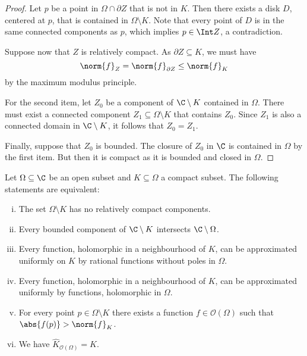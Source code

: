 \begin{proof}
Let $p$ be a point in $\Omega \cap \partial Z$ that is not in $K$.
Then there exists a disk $D$, centered at $p$, that is contained in
$\Omega \setminus K$. Note that every point of $D$ is in the same
connected components as $p$, which implies $p \in \Int Z$, a
contradiction.

Suppose now that $Z$ is relatively compact. As
$\partial Z \subseteq K$, we must have
\[
\norm{f}_Z = \norm{f}_{\partial Z} \leq \norm{f}_K
\]
by the maximum modulus principle.

For the second item, let $Z_0$ be a component of $\C \setminus K$
contained in $\Omega$. There must exist a connected component
$Z_1 \subseteq \Omega \setminus K$ that contains $Z_0$. Since
$Z_1$ is also a connected domain in $\C \setminus K$, it follows
that $Z_0 = Z_1$.

Finally, suppose that $Z_0$ is bounded. The closure of $Z_0$ in
$\C$ is contained in $\Omega$ by the first item. But then it is
compact as it is bounded and closed in $\Omega$.
\end{proof}

\begin{izrek}
Let $\Omega \subseteq \C$ be an open subset and
$K \subseteq \Omega$ a compact subset. The following statements are
equivalent:

\begin{enumerate}[i)]
\item The set $\Omega \setminus K$ has no relatively compact
components.\label{app:eqthm:1}
\item Every bounded component of $\C \setminus K$ intersects
$\C \setminus \Omega$.\label{app:eqthm:2}
\item Every function, holomorphic in a neighbourhood of $K$, can be
approximated uniformly on $K$ by rational functions without poles
in $\Omega$.\label{app:eqthm:3}
\item Every function, holomorphic in a neighbourhood of $K$, can be
approximated uniformly by functions, holomorphic in
$\Omega$.\label{app:eqthm:4}
\item For every point $p \in \Omega \setminus K$ there exists a
function $f \in \mathcal{O}(\Omega)$ such that
$\abs{f(p)} > \norm{f}_K$.\label{app:eqthm:5}
\item We have
$\widehat{K}_{\mathcal{O}(\Omega)} = K$.\label{app:eqthm:6}
\end{enumerate}
\end{izrek}



